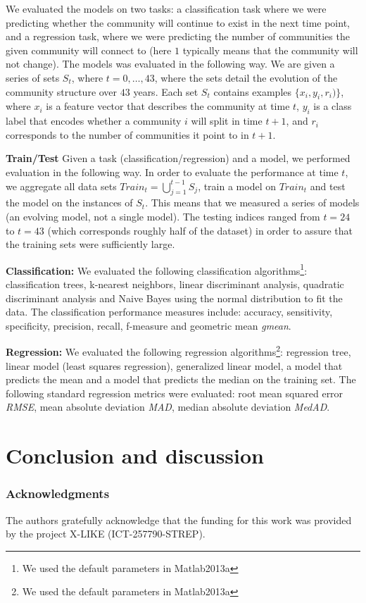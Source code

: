 \documentclass{article} %
\begin{document}
We evaluated the models on two tasks: a classification task where we were predicting whether the community will continue to exist in the next time point, and a regression task, where we were predicting the number of communities the given community will connect to (here $1$ typically means that the community will not change). The models was evaluated in the following way. We are given a series of sets $S_t$, where $t = 0,\ldots, 43$, where the sets detail the evolution of the community structure over $43$ years. Each set $S_t$ contains examples $\{x_i, y_i, r_i)\}$, where $x_i$ is a feature vector that describes the community at time $t$, $y_i$ is a class label that encodes whether a community $i$ will split in time $t+1$, and $r_i$ corresponds to the number of communities it point to in $t+1$.

\textbf{Train/Test} Given a task (classification/regression) and a model, we performed evaluation in the following way. In order to evaluate the performance at time $t$, we aggregate all data sets $Train_t = \bigcup_{j=1}^{t-1}{S_j}$, train a model on $Train_t$ and test the model on the instances of $S_t$. This means that we measured a series of models (an evolving model, not a single model). The testing indices ranged from $t = 24$ to $t = 43$ (which corresponds roughly half of the dataset) in order to assure that the training sets were sufficiently large.

\textbf{Classification:}
We evaluated the following classification algorithms\footnote{We used
the default parameters in Matlab2013a}: classification trees,
k-nearest neighbors, linear discriminant analysis, quadratic
discriminant analysis and Naive Bayes using the normal distribution to
fit the data.
The classification performance measures include: accuracy,
sensitivity, specificity, precision, recall, f-measure and geometric
mean \emph{gmean}.

\textbf{Regression:} We evaluated the following regression
algorithms\footnote{We used the default parameters in Matlab2013a}:
regression tree, linear model (least squares regression), generalized
linear model, a model that predicts the mean and a model that predicts
the median on the training set.
The following standard regression metrics were evaluated: root mean
squared error \emph{RMSE}, mean absolute deviation \emph{MAD}, median
absolute deviation \emph{MedAD}.

\section{Conclusion and discussion}

\subsubsection*{Acknowledgments}
   The authors gratefully acknowledge that the funding for this work was provided by the project X-LIKE (ICT-257790-STREP)\cite{xlike}.




\end{document}

